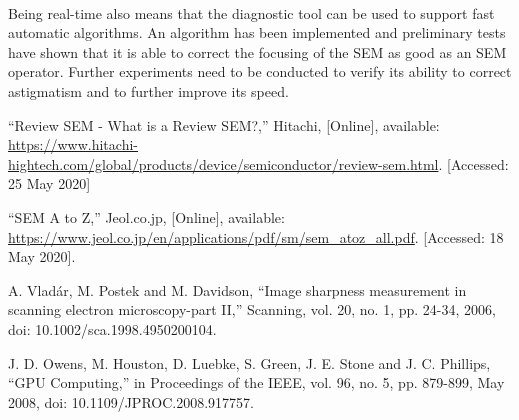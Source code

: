 \documentclass[12pt, twocolumn]{report}
\begin{document}
\paragraph{}
Being real-time also means that the diagnostic tool can be used to support fast automatic algorithms. An algorithm has been implemented and preliminary tests have shown that it is able to correct the focusing of the SEM as good as an SEM operator. Further experiments need to be conducted to verify its ability to correct astigmatism and to further improve its speed.

\begin{thebibliography}{00}


    ``Review SEM - What is a Review SEM?,'' Hitachi, [Online], available: \url{https://www.hitachi-hightech.com/global/products/device/semiconductor/review-sem.html}. [Accessed: 25 May 2020]


    ``SEM A to Z,'' Jeol.co.jp, [Online], available: \url{https://www.jeol.co.jp/en/applications/pdf/sm/sem_atoz_all.pdf}. [Accessed: 18 May 2020].

    A. Vladár, M. Postek and M. Davidson, ``Image sharpness measurement in scanning electron microscopy-part II,'' Scanning, vol. 20, no. 1, pp. 24-34, 2006, doi: 10.1002/sca.1998.4950200104.

    J. D. Owens, M. Houston, D. Luebke, S. Green, J. E. Stone and J. C. Phillips, ``GPU Computing,'' in Proceedings of the IEEE, vol. 96, no. 5, pp. 879-899, May 2008, doi: 10.1109/JPROC.2008.917757.


\end{thebibliography}
\end{document}
